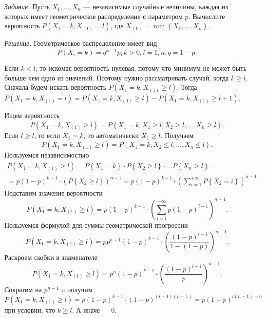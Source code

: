 \textit{Задание.}
Пусть $X_1, \dotsc, X_n$ --- независимые случайные величины, каждая из которых имеет геометрическое распределение с параметром $p$.
Вычислите вероятность $P \left( X_1 = k, X_{ \left( 1 \right) } = l \right) $,
где $X_{ \left( 1 \right) } = \min \left\{ X_1, \dotsc, X_n \right\} $.

\textit{Решение.} Геометрическое распределение имеет вид
$$P \left( X_i = k \right) = q^{k-1} p,
k > 0,
i = \overline{1,n},
q = 1 - p.$$

Если $k < l$, то искомая вероятность нулевая, потому что минимум не может быть больше чем одно из значений.
Поэтому нужно рассматривать случай, когда $k \geq l$.
Сначала будем искать вероятность $P \left( X_1 = k, X_{ \left( 1 \right) } \geq l \right) $.
Тогда
$P \left( X_1 = k, X_{ \left( 1 \right) } = l \right) =
P \left( X_1 = k, X_{ \left( 1 \right) } \geq l \right) - P \left( X_1 = k, X_{ \left( 1 \right) } \geq l + 1 \right) $.

Ищем вероятность
$$P \left( X_1 = k, X_{ \left( 1 \right) } \geq l \right) =
P \left\{ X_1 = k, X_1 \geq l, X_2 \geq l, \dotsc, X_n \geq l \right\}.$$
Если $l \geq l$, то если $X_1 = k$, то автоматически $X_1 \geq l$.
Получаем
$$P \left( X_1 = k, X_{ \left( 1 \right) } \geq l \right) =
P \left( X_1 = k, X_2 \leq l, \dotsc, X_n \leq l \right\}.$$
Пользуемся независимостью
\begin{equation*}
\begin{split}
P \left( X_1 = k, X_{ \left( 1 \right) } \geq l \right) =
P \left\{ X_1 = k \right\} \cdot P \left\{ X_2 \geq l \right\} \cdot \dotsc P \left\{ X_n \geq l \right\} = \\
= p \left( 1-p \right)^{k-1} \cdot \left( P \left\{ X_2 \geq l \right\} \right)^{n-1} =
p \left( 1-p \right)^{k-1} \cdot \left( \sum \limits_{i=1}^{+ \infty } P \left\{ X_2 = i \right\} \right)^{n-1}.
\end{split}
\end{equation*}
Подставим значение вероятности
$$P \left( X_1 = k, X_{ \left( 1 \right) } \geq l \right) =
p \left( 1-p \right)^{k-1} \cdot \left( \sum \limits_{i=l}^{+ \infty } p \left( 1-p \right)^{i-1} \right)^{n-1}.$$
Пользуемся формулой для суммы геометрической прогрессии
$$P \left( X_1 = k, X_{ \left( 1 \right) } \geq l \right) =
pp^{n-1} \left( 1-p \right)^{k-1} \cdot \left( \frac{ \left( 1-p \right)^{l-1}}{1 - \left( 1-p \right) } \right)^{n-1}.$$
Раскроем скобки в знаменателе
$$P \left( X_1 = k, X_{ \left( 1 \right) } \geq l \right) =
p^n \left( 1-p \right)^{k-1} \cdot \left( \frac{ \left( 1-p \right)^{l-1}}{p} \right)^{n-1}.$$
Сократим на $p^{n-1}$ и получим
$$P \left( X_1 = k, X_{ \left( 1 \right) } \geq l \right) =
p \left( 1-p \right)^{k-1} \cdot \left( 1-p \right)^{\left( l-1 \right) \left( n-1 \right)} =
p \left( 1-p \right)^{l \left( n-1 \right) + n}$$
при условии, что $k \geq l$.
А иначе --- 0.

